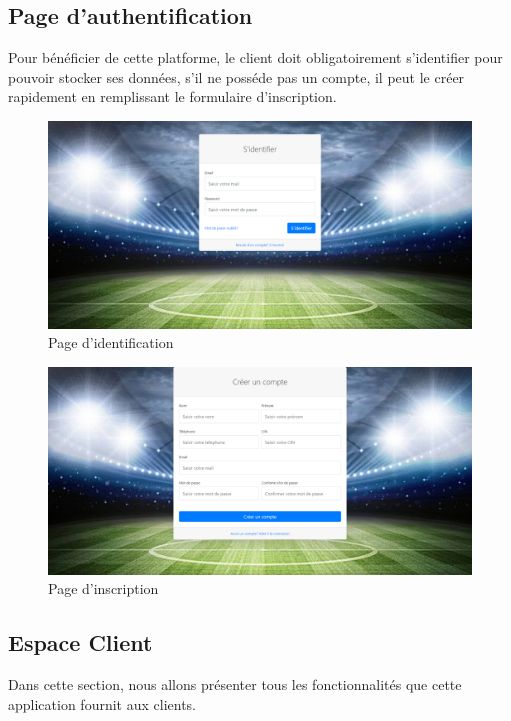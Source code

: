 \documentclass[a4paper]{report}
\begin{document}
\begin{spacing}{2}
\subsection{Page d'authentification}
Pour bénéficier de cette platforme, le client doit obligatoirement s'identifier pour pouvoir stocker ses données, s'il ne posséde pas un compte, il peut le créer rapidement en remplissant le formulaire d'inscription.\\ 
\begin{figure}[!ht]
\begin{center}
\includegraphics[width=18cm]{Screenshots/S'identifier.png}
\end{center}
\caption[Page d'identification]{Page d'identification}
\end{figure}

\begin{figure}[!ht]
\begin{center}
\includegraphics[width=18cm]{Screenshots/CreerCompte.png}
\end{center}
\caption[Page d'inscription]{Page d'inscription}
\end{figure}



\subsection{Espace Client}
Dans cette section, nous allons présenter tous les fonctionnalités que cette application fournit aux clients.

\end{spacing}
\end{document}
